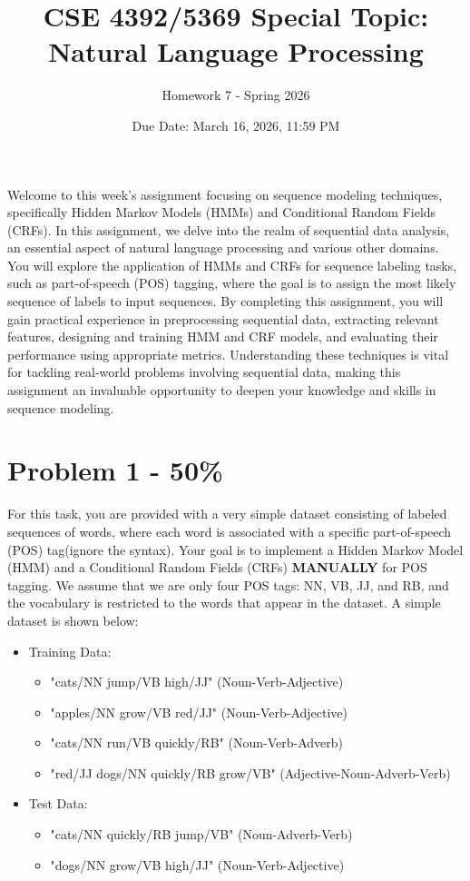 \documentclass{article}
\begin{document}
\title{CSE 4392/5369 Special Topic: Natural Language Processing}
\author{Homework 7 - Spring 2026}
\date{Due Date: March 16, 2026, 11:59 PM}
\maketitle
\thispagestyle{fancy}


Welcome to this week's assignment focusing on sequence modeling techniques, 
specifically Hidden Markov Models (HMMs) and Conditional Random Fields (CRFs). 
In this assignment, we delve into the realm of sequential data analysis, 
an essential aspect of natural language processing and various other domains. 
You will explore the application of HMMs and CRFs for sequence labeling tasks, 
such as part-of-speech (POS) tagging, 
where the goal is to assign the most likely sequence of labels to input sequences. 
By completing this assignment, 
you will gain practical experience in preprocessing sequential data, 
extracting relevant features, designing and training HMM and CRF models, 
and evaluating their performance using appropriate metrics. 
Understanding these techniques is vital for tackling real-world problems involving sequential data, 
making this assignment an invaluable opportunity to deepen your knowledge and skills in sequence modeling.

\section*{Problem 1 - 50\%}

For this task, you are provided with a very simple dataset consisting of labeled sequences of words, 
where each word is associated with a specific part-of-speech (POS) tag(ignore the syntax). 
Your goal is to implement a Hidden Markov Model (HMM) and a Conditional Random Fields (CRFs) 
\textbf{MANUALLY} for POS tagging. We assume that we are only four
POS tags: NN, VB, JJ, and RB, and the vocabulary is restricted to the words
that appear in the dataset. A simple dataset is shown below:

\begin{itemize}
    \item Training Data:
    \begin{itemize}
        \item "cats/NN jump/VB high/JJ" (Noun-Verb-Adjective)
        \item "apples/NN grow/VB red/JJ" (Noun-Verb-Adjective)
        \item "cats/NN run/VB quickly/RB" (Noun-Verb-Adverb)
        \item "red/JJ dogs/NN quickly/RB grow/VB" (Adjective-Noun-Adverb-Verb)
    \end{itemize}
    
    \item Test Data:
    \begin{itemize}
        \item "cats/NN quickly/RB jump/VB" (Noun-Adverb-Verb)
        \item "dogs/NN grow/VB high/JJ" (Noun-Verb-Adjective)
    \end{itemize}
\end{itemize}
\end{document}
